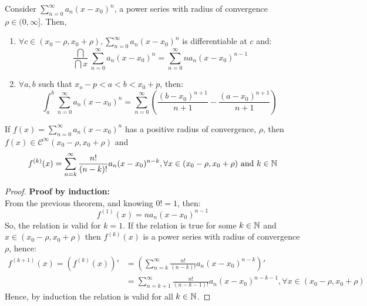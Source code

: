 \begin{theorem}
    Consider $\sum_{n=0}^\infty a_n(x - x_0)^n$, a power series with radius of convergence $\rho \in (0, \infty]$. Then,
    \begin{enumerate}
        \item $\forall c \in (x_0 - \rho, x_0 + \rho), \sum_{n=0}^\infty a_n(x - x_0)^n$ is differentiable at $c$ and:
            \begin{equation*}
                \frac{\dint}{\dint x} \sum \limits_{n=0}^\infty a_n(x - x_0)^n = \sum \limits_{n=0}^\infty n a_n (x - x_0)^{n-1}
            \end{equation*}
        \item $\forall a, b$ such that $x_o - p < a <  b < x_0 + p$, then:
            \begin{equation*}
                \int_a^b \sum \limits_{n = 0}^\infty a_n(x- x_0)^n = \sum \limits_{n=0}^\infty \left(
                    \frac{(b-x_0)^{n+1}}{n+1} - \frac{(a - x_0)^{n+1}}{n + 1}
                \right)
            \end{equation*}
    \end{enumerate}
\end{theorem}

\begin{corollary}
    If $f(x) = \sum_{n=0}^\infty a_n (x-x_0)^n$ has a positive radius of convergence, $\rho$, then $f(x) \in \mathcal{C}^\infty(x_0 - \rho, x_0 + \rho)$ and
    \begin{equation*}
        f^{(k)}(x) = \sum \limits_{n = k}^\infty \frac{n!}{(n-k)!}a_n (x - x_0)^{n-k}, \forall x \in (x_0 - \rho, x_0 + \rho) \text{ and } k \in \mathbb{N}
    \end{equation*}
\end{corollary}

\begin{proof}
    \textbf{Proof by induction:}\\
    From the previous theorem, and knowing $0! = 1$, then:
    \begin{equation*}
        f^{(1)}(x) = n a_n (x - x_0)^{n-1}
    \end{equation*}
    So, the relation is valid for $k = 1$. If the relation is true for some $k \in \mathbb{N}$ and $x \in (x_0 - \rho, x_0 + \rho)$ then $f^{(k)}(x)$ is a power series with radius of convergence $\rho$, hence:
    \begin{align*}
        f^{(k+1)}(x) = (f^{(k)}(x))' &= \left(
            \sum \limits_{n=k}^\infty \frac{n!}{(n-k)!}a_n (x-x_0)^{n-k}
        \right)' \\
        &= \sum \limits_{n = k + 1}^\infty \frac{n!}{(n-k-1)!}a_n (x - x_0)^{n-k-1}, \forall x \in (x_0 - \rho, x_0 + \rho)
    \end{align*}
    Hence, by induction the relation is valid for all $k \in \mathbb{N}$.
\end{proof}

